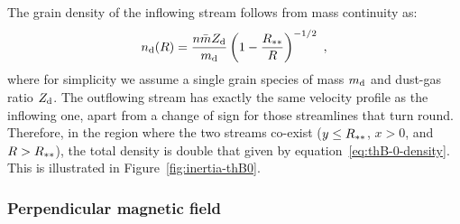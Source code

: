 The grain density of the inflowing stream follows from mass continuity as:
\begin{equation}
  \label{eq:thB-0-density}
  n_{\text{d}}(R) = \frac{n \bar{m} Z_{\text{d}}}{m_{\text{d}}}
  \left( 1 - \frac{R_{**}}{R} \right)^{-1/2} \ ,
\end{equation}
where for simplicity we assume a single grain species of mass
\(m_{\text{d}}\) and dust-gas ratio \(Z_{\text{d}}\). The outflowing stream has
exactly the same velocity profile as the inflowing one, apart from a
change of sign for those streamlines that turn round.  Therefore, in
the region where the two streams co-exist (\(y \le R_{**}\),
\(x > 0\), and \(R > R_{**}\)), the total density is double that
given by equation~\eqref{eq:thB-0-density}.  This is illustrated in
Figure~\ref{fig:inertia-thB0}.

\subsubsection{Perpendicular magnetic field}
\label{sec:perp-magn-field}


